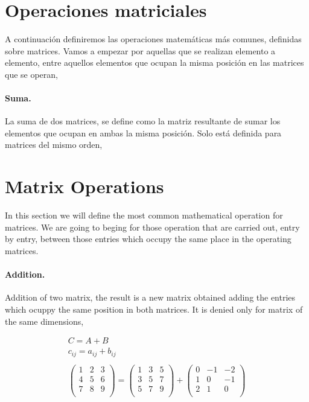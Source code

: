 \begin{paracol}{2}
\section{Operaciones matriciales}\label{opmatr}  
A continuación definiremos las operaciones matemáticas más comunes, definidas sobre matrices. Vamos a empezar por aquellas que se realizan elemento a elemento, entre aquellos elementos que ocupan la misma posición en las matrices que se operan,

\paragraph{Suma.} La suma de dos matrices, se define como la matriz resultante de sumar los elementos que ocupan en ambas la misma posición. Solo está definida para matrices del mismo orden,

\switchcolumn
\section{Matrix Operations}
In this section we will define the most common mathematical operation for matrices. We are going to beging for those operation that are carried out, entry by entry, between those entries which occupy the same place in the operating matrices.

\paragraph{Addition.} Addition of two matrix, the result is a new matrix obtained adding the entries which ocuppy the same position in both matrices. It is denied only for matrix of the same dimensions, 

\end{paracol}
\begin{gather*}
C=A+B\\
c_{ij}=a_{ij}+b_{ij}\\
\\
\begin{pmatrix}
1& 2& 3\\
4& 5& 6\\
7& 8& 9\\
\end{pmatrix} =
\begin{pmatrix}
1& 3& 5\\
3& 5& 7\\
5& 7& 9\\
\end{pmatrix} +
\begin{pmatrix}
0& -1& -2\\
1& 0& -1\\
2& 1& 0\\
\end{pmatrix}
\end{gather*}
